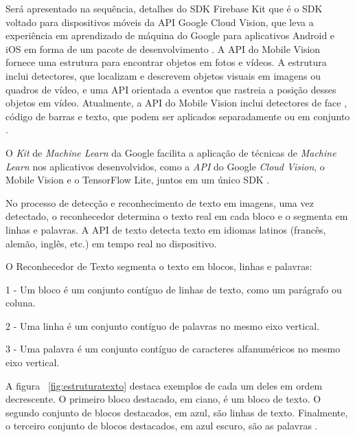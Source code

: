 Será apresentado na sequência, detalhes do  SDK Firebase  Kit que é o SDK voltado para dispositivos móveis da API Google Cloud Vision, que leva a experiência em aprendizado de máquina do Google para aplicativos Android e iOS em forma de um pacote de desenvolvimento \cite{CODELABS}. A API do Mobile Vision fornece uma estrutura para encontrar objetos em fotos e vídeos. A estrutura inclui detectores, que localizam e descrevem objetos visuais em imagens ou quadros de vídeo, e uma API orientada a eventos que rastreia a posição desses objetos em vídeo. Atualmente, a API do Mobile Vision inclui detectores de face , código de barras e texto, que podem ser aplicados separadamente ou em conjunto \cite{INTROMOBILEVISION}.





O \textit{Kit} de \textit{Machine Learn} \cite{pubdev}
da Google facilita a aplicação de técnicas de \textit{Machine Learn} nos aplicativos desenvolvidos, como a \textit{API} do Google \textit{Cloud Vision}, o Mobile Vision e o TensorFlow Lite, juntos em um único SDK \cite{CODELABS}.



No processo de detecção e reconhecimento de texto em imagens, uma vez detectado, o reconhecedor determina o texto real em cada bloco e o segmenta em linhas e palavras. A API de texto detecta texto em idiomas latinos (francês, alemão, inglês, etc.) em tempo real no dispositivo.

O Reconhecedor de Texto segmenta o texto em blocos, linhas e palavras:

1 - Um bloco é um conjunto contíguo de linhas de texto, como um parágrafo ou coluna.

2 - Uma linha é um conjunto contíguo de palavras no mesmo eixo vertical.

3 - Uma palavra é um conjunto contíguo de caracteres alfanuméricos no mesmo eixo vertical.

A figura ~\ref{fig:estruturatexto} destaca exemplos de cada um deles em ordem decrescente. O primeiro bloco destacado, em ciano, é um bloco de texto. O segundo conjunto de blocos destacados, em azul, são linhas de texto. Finalmente, o terceiro conjunto de blocos destacados, em azul escuro, são as palavras \cite{MOBILEVISION}.

